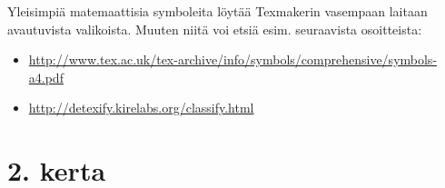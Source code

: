 \begin{frame}[fragile]
    
\end{frame}

\begin{frame}[fragile]
    
\end{frame}

\begin{frame}[fragile]
    Yleisimpiä matemaattisia symboleita löytää Texmakerin vasempaan laitaan avautuvista valikoista. Muuten niitä voi etsiä esim. seuraavista osoitteista:
    \begin{scriptsize}
        \begin{itemize}
            \item \url{http://www.tex.ac.uk/tex-archive/info/symbols/comprehensive/symbols-a4.pdf}
            \item \url{http://detexify.kirelabs.org/classify.html}
        \end{itemize}
    \end{scriptsize}
    

\end{frame}



\section{2. kerta}



